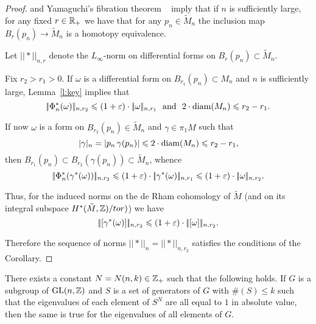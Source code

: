 \documentclass{amsart}
\begin{document}
\begin{proof} \cite[theorem 0.1]{FY} and
Yamaguchi's fibration theorem ~\cite{Yam} imply
that if $n$ is sufficiently large,
for any fixed $r\in {\Bbb R}_+$
we have that for any $p_n\in \tilde M_n$
the inclusion map $B_r(p_n)\to \tilde M_n$ is a homotopy equivalence.

Let $|\!|*|\!|_{n,r}$ denote the $L_\infty$-norm
on differential forms on $B_{r}(p_n)\subset \tilde M_n$.


Fix $r_2>r_1>0$.
If $\omega$ is a differential form on  $B_{r_1}(p_n)\subset M_n$
and $n$ is sufficiently large,  Lemma~\ref{l:key} implies that
$$|\!|\Phi^*_n(\omega)|\!|_{n,r_2}
\leqslant
(1+\varepsilon)\cdot|\!|\omega |\!|_{n,r_1}
\ \ \text{and}\ \ 2\cdot \operatorname{\rm diam}(M_n)\leqslant r_2-r_1.$$

If now $\omega$ is a form on
$B_{r_2}(p_n)\in \tilde M_n$ and
$\gamma\in \pi_1M$
such that
$$|\gamma|_n=|p_n\,\gamma(p_n)|\leqslant 2\cdot \operatorname{\rm diam}(M_n)\leqslant  r_2-r_1,$$
then $B_{r_1}(p_n)\subset B_{r_2}(\gamma(p_n))\subset \tilde M_n$, whence
$$|\!|\Phi^*_n(\gamma^*(\omega))|\!|_{n,r_2}\leqslant
(1+\varepsilon)\cdot|\!|\gamma^*(\omega)|\!|_{n,r_1}\leqslant
(1+\varepsilon)\cdot|\!|\omega|\!|_{n,r_2}.$$

Thus, for the induced norms on the de Rham cohomology
of $\tilde M$ (and on its integral subspace $H^*(\tilde M,{\Bbb Z})/tor)$)  we have
$$|\!|[\gamma^*(\omega)]|\!|_{n,r_2}\leqslant
(1+\varepsilon)\cdot|\!|[\omega]|\!|_{n,r_2}.$$

Therefore the sequence of norms $|\!|*|\!|_n=|\!|*|\!|_{n,r_2}$ satisfies the conditions of the Corollary.
\end{proof}


\begin{lem}\label{lem:eigen}
There exists a constant $N=N(n,k)\in {\Bbb Z}_+$ such that the following holds.
If $G$ is a subgroup of $\mathrm{GL}(n,{\Bbb Z})$ and $S$ is a set of generators of $G$
with $\#(S)\le k$ such that the eigenvalues of each element of
$S^N$ are all equal to $1$ in absolute value,
then the same is true for the eigenvalues of all
elements of $G$.
\end{lem}
\end{document}
